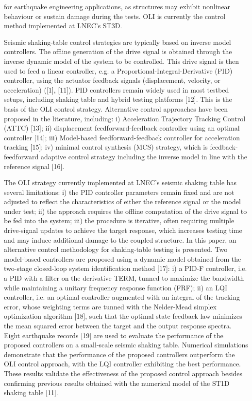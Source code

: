 \documentclass[conference]{IEEEtran}
\begin{document}
for earthquake engineering applications, as structures may exhibit nonlinear behaviour or sustain damage during the tests. OLI is currently the control method implemented at LNEC's ST3D.

Seismic shaking-table control strategies are typically based on inverse model controllers. The offline generation of the drive signal is obtained through the inverse dynamic model of the system to be controlled. This drive signal is then used to feed a linear controller, e.g. a Proportional-Integral-Derivative (PID) controller, using the actuator feedback signals (displacement, velocity, or acceleration) ([1], [11]). PID controllers remain widely used in most testbed setups, including shaking table and hybrid testing platforms [12]. This is the basis of the OLI control strategy. Alternative control approaches have been proposed in the literature, including: i) Acceleration Trajectory Tracking Control (ATTC) [13]; ii) displacement feedforward-feedback controller using an optimal controller [14]; iii) Model-based feedforward-feedback controller for acceleration tracking [15]; iv) minimal control synthesis (MCS) strategy, which is feedback-feedforward adaptive control strategy including the inverse model in line with the reference signal [16].

The OLI strategy currently implemented at LNEC's seismic shaking table has several limitations: i) the PID controller parameters remain fixed and are not adjusted to reflect the characteristics of either the reference signal or the model under test; ii) the approach requires the offline computation of the drive signal to be fed into the system; iii) the procedure is iterative, often requiring multiple drive-signal updates to achieve the target response, which increases testing time and may induce additional damage to the coupled structure. In this paper, an alternative control methodology for shaking-table testing is presented. Two model-based controllers are proposed using a dynamic model obtained from the two-stage closed-loop system identification method [17]: i) a PID-F controller, i.e. a PID with a filter on the derivative TERM, tunned to maximize the bandwidth while maintaining a unitary frequency response function (FRF); ii) an LQI controller, i.e. an optimal controller augmented with an integral of the tracking error, whose weighting terms are tunned with the Nelder-Mead simplex optimization algorithm [18], such that the optimal state feedback law minimizes the mean squared error between the target and the output response spectra. Eight earthquake records [19] are used to evaluate the performance of the proposed controllers on a small-scale seismic shaking table. Numerical simulations demonstrate that the performance of the proposed controllers outperform the OLI control approach, with the LQI controller exhibiting the best performance. These results validate the effectiveness of the proposed control approach besides confirming previous results obtained with the numerical model of the ST1D shaking table [11]. 
\end{document}
